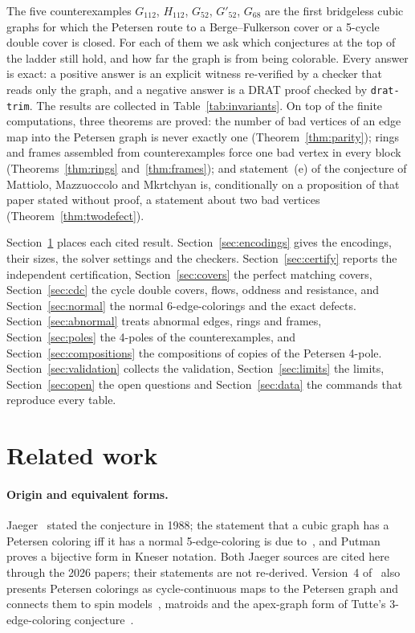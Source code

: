 \documentclass[11pt]{article}
\theoremstyle{definition}
\theoremstyle{remark}
\newcommand{\Gmain}{G_{112}}
\newcommand{\Gsym}{H_{112}}
\newcommand{\Gfty}{G_{52}}
\newcommand{\Gftyb}{G'_{52}}
\newcommand{\Gsix}{G_{68}}
\begin{document}
The five counterexamples $\Gmain$, $\Gsym$, $\Gfty$, $\Gftyb$, $\Gsix$ are the first bridgeless
cubic graphs for which the Petersen route to a Berge--Fulkerson cover or a 5-cycle double cover is
closed. For each of them we ask which conjectures at the top of the ladder still hold, and how far
the graph is from being colorable. Every answer is exact: a positive answer is an explicit witness
re-verified by a checker that reads only the graph, and a negative answer is a DRAT proof checked
by \texttt{drat-trim}. The results are collected in Table~\ref{tab:invariants}. On top of the
finite computations, three theorems are proved: the number of bad vertices of an edge map into the
Petersen graph is never exactly one (Theorem~\ref{thm:parity}); rings and frames assembled from
counterexamples force one bad vertex in every block (Theorems~\ref{thm:rings}
and~\ref{thm:frames}); and statement~(e) of the conjecture of Mattiolo, Mazzuoccolo and
Mkrtchyan is, conditionally on a proposition of that paper stated without proof, a statement about two bad
vertices (Theorem~\ref{thm:twodefect}).

Section~\ref{sec:related} places each cited result. Section~\ref{sec:encodings} gives the
encodings, their sizes, the solver settings and the checkers. Section~\ref{sec:certify} reports
the independent certification, Section~\ref{sec:covers} the perfect matching covers,
Section~\ref{sec:cdc} the cycle double covers, flows, oddness and resistance, and
Section~\ref{sec:normal} the normal 6-edge-colorings and the exact defects. Section~\ref{sec:abnormal}
treats abnormal edges, rings and frames, Section~\ref{sec:poles} the 4-poles of the
counterexamples, and Section~\ref{sec:compositions} the compositions of copies of the Petersen
4-pole. Section~\ref{sec:validation} collects the validation, Section~\ref{sec:limits} the limits,
Section~\ref{sec:open} the open questions and Section~\ref{sec:data} the commands that reproduce
every table.

\section{Related work}\label{sec:related}

\paragraph{Origin and equivalent forms.} Jaeger~\cite{Jaeger1988} stated the conjecture in 1988; the
statement that a cubic graph has a Petersen coloring iff it has a normal 5-edge-coloring is
due to~\cite{Jaeger1985}, and Putman~\cite{Putman2026} proves a bijective form in Kneser notation.
Both Jaeger sources are cited here through the 2026 papers; their statements are not re-derived.
Version~4 of~\cite{GJMMMU2026} also presents Petersen colorings as cycle-continuous maps to the
Petersen graph and connects them to spin models~\cite{Beaudin2010}, matroids and the apex-graph form of Tutte's
3-edge-coloring conjecture~\cite{Inoue2026}.
\end{document}
